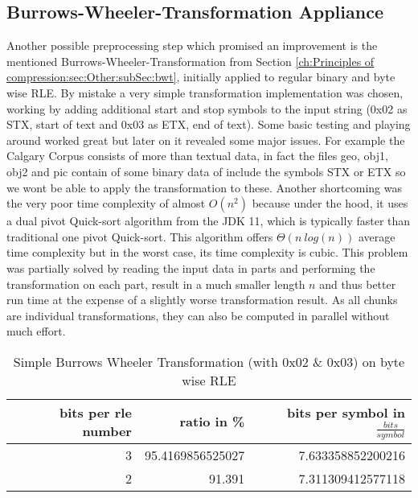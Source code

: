 \subsection{Burrows-Wheeler-Transformation Appliance}
\par{
Another possible preprocessing step which promised an improvement is the mentioned Burrows-Wheeler-Transformation from Section \ref{ch:Principles of compression:sec:Other:subSec:bwt}, initially applied to regular binary and byte wise RLE. By mistake a very simple transformation implementation was chosen, working by adding additional start and stop symbols to the input string (0x02 as STX, start of text and 0x03 as ETX, end of text). Some basic testing and playing around worked great but later on it revealed some major issues. For example the Calgary Corpus consists of more than textual data, in fact the files geo, obj1, obj2 and pic contain of some binary data of include the symbols STX or ETX so we wont be able to apply the transformation to these. Another shortcoming was the very poor time complexity of almost $O (n^2)$ because under the hood, it uses a dual pivot Quick-sort algorithm from the JDK 11, which is typically faster than traditional one pivot Quick-sort. This algorithm offers $\Theta (n \: log(n))$ average time complexity but in the worst case, its time complexity is cubic. This problem was partially solved by reading the input data in parts and performing the transformation on each part, result in a much smaller length $n$ and thus better run time at the expense of a slightly worse transformation result. As all chunks are individual transformations, they can also be computed in parallel without much effort.

\begin{table}[H]
	\centering
	\begin{tabular}{r|r|r}	
		bits per rle number & ratio in \% & bits per symbol in $\frac{bits}{symbol}$\\
		\hline
		3 & 95.4169856525027 & 7.633358852200216\\
		2 & 91.391 & 7.311309412577118 \\
	\end{tabular}
	\caption{Simple Burrows Wheeler Transformation (with 0x02 \& 0x03) on byte wise RLE}
	\label{tab:t11 Simple Burrows Wheeler Transformation on byte wise RLE}
\end{table}
}
